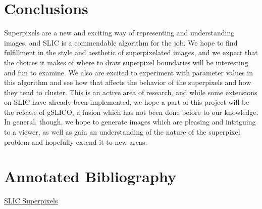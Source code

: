 \documentclass[11pt]{article}
\begin{document}
\section {Conclusions}\label{conclusions}
Superpixels are a new and exciting way of representing and understanding images, and SLIC is a commendable algorithm for the job. We hope to find fulfillment in the style and aesthetic of superpixelated images, and we expect that the choices it makes of where to draw superpixel boundaries will be interesting and fun to examine. We also are excited to experiment with parameter values in this algorithm and see how that affects the behavior of the superpixels and how they tend to cluster. This is an active area of research, and while some extensions on SLIC have already been implemented, we hope a part of this project will be the release of gSLICO, a fusion which has not been done before to our knowledge. In general, though, we hope to generate images which are pleasing and intriguing to a viewer, as well as gain an understanding of the nature of the superpixel problem and hopefully extend it to new areas.





\newpage
\onecolumn

\section*{Annotated Bibliography}\label{annon}

\hyperlink{https://infoscience.epfl.ch/record/149300/files/SLIC_Superpixels_TR_2.pdf}{SLIC Superpixels} \cite{slic}
\end{document}
